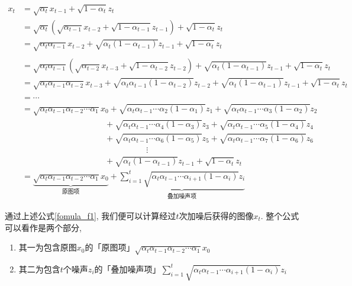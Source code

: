 \begin{equation}
\begin{aligned}
\label{fomula_f1}
x_t &= \sqrt{\alpha_t}x_{t-1}+\sqrt{1-\alpha_t}z_t\\
&= \sqrt{\alpha_t}\left(\sqrt{\alpha_{t-1}}x_{t-2}+\sqrt{1-\alpha_{t-1}}z_{t-1}\right)+\sqrt{1-\alpha_t}z_t\\
&= \sqrt{\alpha_t\alpha_{t-1}}x_{t-2}+\sqrt{\alpha_t(1-\alpha_{t-1})}z_{t-1}+\sqrt{1-\alpha_t}z_t\\
\\
&= \sqrt{\alpha_t\alpha_{t-1}}\left(\sqrt{\alpha_{t-2}}x_{t-3}+\sqrt{1-\alpha_{t-2}}z_{t-2}\right)+\sqrt{\alpha_t(1-\alpha_{t-1})}z_{t-1}+\sqrt{1-\alpha_t}z_t\\
&= \sqrt{\alpha_t\alpha_{t-1}\alpha_{t-2}}x_{t-3}+\sqrt{\alpha_t\alpha_{t-1}(1-\alpha_{t-2})}z_{t-2}+\sqrt{\alpha_t(1-\alpha_{t-1})}z_{t-1}+\sqrt{1-\alpha_t}z_t\\
\\
&=\cdots\\
&=\sqrt{\alpha_t\alpha_{t-1}\alpha_{t-2}\cdots\alpha_1}x_0+\sqrt{\alpha_t\alpha_{t-1}\cdots\alpha_2(1-\alpha_1)}z_1+\sqrt{\alpha_t\alpha_{t-1}\cdots\alpha_3(1-\alpha_2)}z_2\\
&\quad\quad\quad\quad\quad\quad\quad\quad\quad\quad+ \sqrt{\alpha_t\alpha_{t-1}\cdots\alpha_4(1-\alpha_3)}z_3+ \sqrt{\alpha_t\alpha_{t-1}\cdots\alpha_5(1-\alpha_4)}z_4\\
&\quad\quad\quad\quad\quad\quad\quad\quad\quad\quad+ \sqrt{\alpha_t\alpha_{t-1}\cdots\alpha_6(1-\alpha_5)}z_5+ \sqrt{\alpha_t\alpha_{t-1}\cdots\alpha_7(1-\alpha_6)}z_6\\
&\quad\quad\quad\quad\quad\quad\quad\quad\quad\quad\quad\quad\quad\quad\quad\vdots\\
&\quad\quad\quad\quad\quad\quad\quad\quad\quad\quad+ \sqrt{\alpha_t(1-\alpha_{t-1})}z_{t-1}+ \sqrt{1-\alpha_t}z_{t}\\
&= \underbrace{\sqrt{\alpha_t\alpha_{t-1}\alpha_{t-2}\cdots\alpha_1}x_0}_{\text{原图项}}+ \underbrace{\sum_{i=1}^t\sqrt{\alpha_t\alpha_{t-1}\cdots\alpha_{i+1}(1-\alpha_i)}z_i}_{\text{叠加噪声项}}
\end{aligned}
\end{equation}


通过上述公式\ref{fomula_f1}, 我们便可以计算经过$t$次加噪后获得的图像$x_t$. 整个公式可以看作是两个部分, 

\begin{enumerate}
    \item 其一为包含原图$x_0$的「原图项」$\sqrt{\alpha_t\alpha_{t-1}\alpha_{t-2}\cdots\alpha_1}x_0$
    \item 其二为包含$t$个噪声$z_i$的「叠加噪声项」$\sum_{i=1}^t\sqrt{\alpha_t\alpha_{t-1}\cdots\alpha_{i+1}(1-\alpha_i)}z_i$
\end{enumerate}

